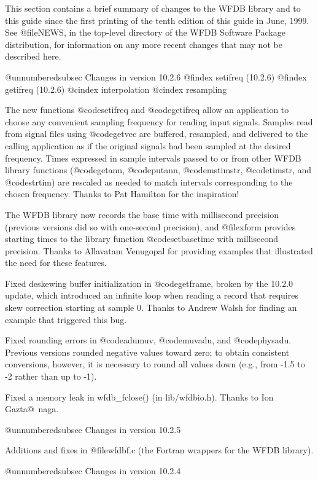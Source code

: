 This section contains a brief summary of changes to the WFDB library and
to this guide since the first printing of the tenth edition of this
guide in June, 1999.  See @file{NEWS}, in the top-level directory of the
WFDB Software Package distribution, for information on any more recent
changes that may not be described here.

@unnumberedsubsec Changes in version 10.2.6
@findex setifreq (10.2.6)
@findex getifreq (10.2.6)
@cindex interpolation
@cindex resampling

The new functions @code{setifreq} and @code{getifreq} allow an
application to choose any convenient sampling frequency for reading
input signals.  Samples read from signal files using @code{getvec} are
buffered, resampled, and delivered to the calling application as if the
original signals had been sampled at the desired frequency.  Times
expressed in sample intervals passed to or from other WFDB library
functions (@code{getann}, @code{putann}, @code{mstimstr}, @code{timstr},
and @code{strtim}) are rescaled as needed to match intervals
corresponding to the chosen frequency.  Thanks to Pat Hamilton for the
inspiration!

The WFDB library now records the base time with millisecond precision
(previous versions did so with one-second precision), and @file{xform}
provides starting times to the library function @code{setbasetime} with
millisecond precision.  Thanks to Allavatam Venugopal for providing
examples that illustrated the need for these features.

Fixed deskewing buffer initialization in @code{getframe}, broken by the
10.2.0 update, which introduced an infinite loop when reading a record
that requires skew correction starting at sample 0.  Thanks to Andrew
Walsh for finding an example that triggered this bug.

Fixed rounding errors in @code{adumuv}, @code{muvadu}, and @code{physadu}.
Previous versions rounded negative values toward zero;  to obtain consistent
conversions, however, it is necessary to round all values down (e.g., from
-1.5 to -2 rather than up to -1).

Fixed a memory leak in wfdb_fclose() (in lib/wfdbio.h).  Thanks to
Ion Gazta@~naga.

@unnumberedsubsec Changes in version 10.2.5

Additions and fixes in @file{wfdbf.c} (the Fortran wrappers for the WFDB
library).

@unnumberedsubsec Changes in version 10.2.4


